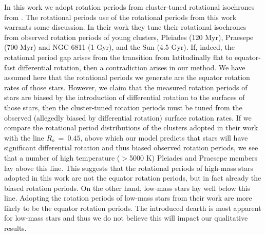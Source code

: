 In this work we adopt rotation periods from cluster-tuned rotational isochrones from \citet{spada_competing_2020}.
The rotational periods use of the rotational periods from this work warrants some discussion.
In their work they tune their rotational isochrones from observed rotation periods of young clusters, Pleiades (120 Myr), Praesepe (700 Myr) and NGC 6811 (1 Gyr), and the Sun (4.5 Gyr).
If, indeed, the rotational period gap arises from the transition from latitudinally flat to equator-fast differential rotation, then a contradiction arises in our method.
We have assumed here that the rotational periods we generate are the equator rotation rates of those stars.
However, we claim that the measured rotation periods of stars are biased by the introduction of differential rotation to the surfaces of those stars, then the cluster-tuned rotation periods must be tuned from the observed (allegedly biased by differential rotation) surface rotation rates.
If we compare the rotational period distributions of the clusters adopted in their work with the line $R_o \ = \ 0.45$, above which our model predicts that stars will have significant differential rotation and thus biased observed rotation periods, we see that a number of high temperature ($>$5000 K) Pleiades and Praesepe members lay above this line.
This suggests that the rotational periods of high-mass stars adopted in this work are not the equator rotation periods, but in fact already the biased rotation periods.
On the other hand, low-mass stars lay well below this line.
Adopting the rotation periods of low-mass stars from their work are more likely to be the equator rotation periods.
The introduced dearth is most apparent for low-mass stars and thus we do not believe this will impact our qualitative results.

